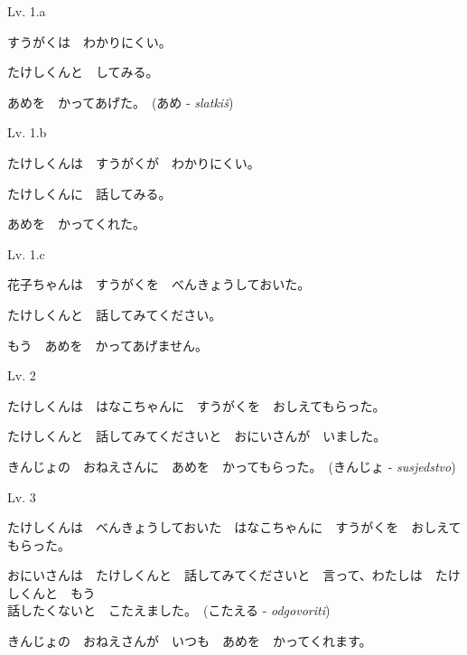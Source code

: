 
\author{Tomislav Mamić}

	
	\begin{mondai}{Lv. 1.a}
		\item すうがくは　わかりにくい。
		\item たけしくんと　してみる。
		\item あめを　かってあげた。　(あめ - \textit{slatkiš})
	\end{mondai}

	\begin{mondai}{Lv. 1.b}
		\item たけしくんは　すうがくが　わかりにくい。
		\item たけしくんに　話してみる。
		\item あめを　かってくれた。
	\end{mondai}

	\begin{mondai}{Lv. 1.c}
		\item 花子ちゃんは　すうがくを　べんきょうしておいた。
		\item たけしくんと　話してみてください。
		\item もう　あめを　かってあげません。
	\end{mondai}

	\begin{mondai}{Lv. 2}
		\item たけしくんは　はなこちゃんに　すうがくを　おしえてもらった。
		\item たけしくんと　話してみてくださいと　おにいさんが　いました。
		\item きんじょの　おねえさん\footnotemark[1]に　あめを　かってもらった。　(きんじょ - \textit{susjedstvo})
	\end{mondai}

	\begin{mondai}{Lv. 3}
		\item *たけしくんは　べんきょうしておいた　はなこちゃんに　すうがくを　おしえてもらった。
		\item おにいさんは　たけしくんと　話してみてくださいと　言って、わたしは　たけしくんと　もう\\話したくないと　こたえました。　(こたえる - \textit{odgovoriti})
		\item きんじょの　おねえさんが　いつも　あめを　かってくれます。
	\end{mondai}

